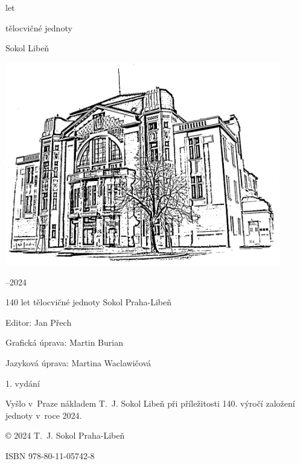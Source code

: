 \documentclass[a5paper, 11pt, twoside]{article}
\newcommand{\titlesize}{\fontsize{36pt}{54pt}}
\begin{document}
\begin{center}
  \setlength{\parskip}{6pt}
  \vspace*{18pt}
  {\fontsize{56pt}{66pt} let}

  {\titlesize\tyrs tělocvičné jednoty}
  
  {\titlesize\tyrs Sokol Libeň}

  \vspace*{\fill}

    \includegraphics*[width=0.9\textwidth]{./Sokolovna-kresba-black.png}

  \vspace*{\fill}

  {\titlesize{}–2024}
  \vspace*{-1cm}
\end{center}

\mbox{}
\clearpage

\vspace*{\fill}
{ \parindent0pt \parskip3pt
140 let tělocvičné jednoty Sokol Praha-Libeň

Editor: Jan Přech 

Grafická úprava: Martin Burian 

Jazyková úprava: Martina Waclawičová

1. vydání 

Vyšlo v~Praze nákladem T.~J. Sokol Libeň při příležitosti 140. výročí založení jednoty v~roce 2024.

© 2024 T.~J. Sokol Praha-Libeň

ISBN 978-80-11-05742-8
}
\clearpage


\tableofcontents
\end{document}
